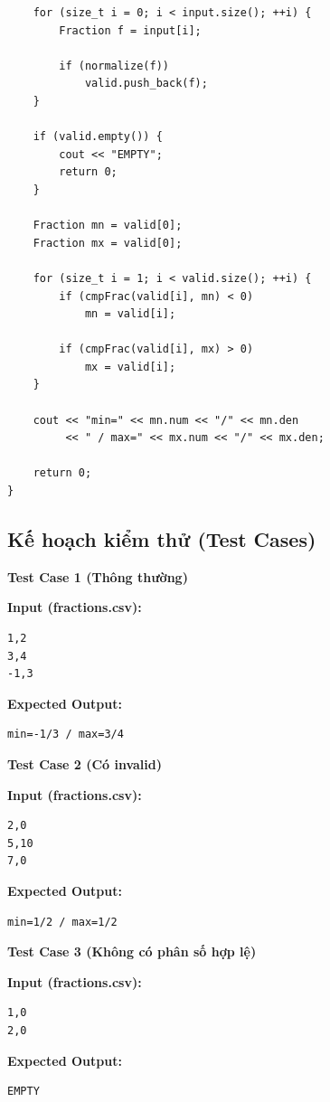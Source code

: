 \begin{lstlisting}
    for (size_t i = 0; i < input.size(); ++i) {
        Fraction f = input[i];

        if (normalize(f))
            valid.push_back(f);
    }

    if (valid.empty()) {
        cout << "EMPTY";
        return 0;
    }

    Fraction mn = valid[0];
    Fraction mx = valid[0];

    for (size_t i = 1; i < valid.size(); ++i) {
        if (cmpFrac(valid[i], mn) < 0)
            mn = valid[i];

        if (cmpFrac(valid[i], mx) > 0)
            mx = valid[i];
    }

    cout << "min=" << mn.num << "/" << mn.den
         << " / max=" << mx.num << "/" << mx.den;

    return 0;
}
\end{lstlisting}

\subsection{Kế hoạch kiểm thử (Test Cases)}

\textbf{Test Case 1 (Thông thường)}

\textbf{Input (fractions.csv):}
\begin{lstlisting}
1,2
3,4
-1,3
\end{lstlisting}

\textbf{Expected Output:}
\begin{lstlisting}
min=-1/3 / max=3/4
\end{lstlisting}

\vspace{0.5cm}

\textbf{Test Case 2 (Có invalid)}

\textbf{Input (fractions.csv):}
\begin{lstlisting}
2,0
5,10
7,0
\end{lstlisting}

\textbf{Expected Output:}
\begin{lstlisting}
min=1/2 / max=1/2
\end{lstlisting}

\vspace{0.5cm}

\textbf{Test Case 3 (Không có phân số hợp lệ)}

\textbf{Input (fractions.csv):}
\begin{lstlisting}
1,0
2,0
\end{lstlisting}

\textbf{Expected Output:}
\begin{lstlisting}
EMPTY
\end{lstlisting}